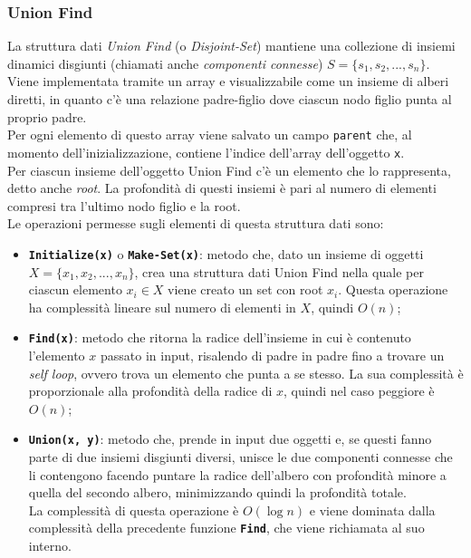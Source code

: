 	\subsubsection{Union Find}
		La struttura dati \textit{Union Find} (o \textit{Disjoint-Set}) mantiene una collezione di insiemi dinamici disgiunti (chiamati anche \textit{componenti connesse}) $S = \{s_1, s_2, ... , s_n\}$.
		Viene implementata tramite un array e visualizzabile come un insieme di alberi diretti, in quanto c'è una relazione padre-figlio dove ciascun nodo figlio punta al proprio padre.\\
		Per ogni elemento di questo array viene salvato un campo \texttt{parent} che, al momento dell'inizializzazione, contiene l'indice dell'array dell'oggetto \texttt{x}.\\
		Per ciascun insieme dell'oggetto Union Find c'è un elemento che lo rappresenta, detto anche \textit{root}. 
		La profondità di questi insiemi è pari al numero di elementi compresi tra l'ultimo nodo figlio e la root.\\
		Le operazioni permesse sugli elementi di questa struttura dati sono:
		\begin{itemize}
			\item \texttt{\textbf{Initialize(x)}} o \texttt{\textbf{Make-Set(x)}}: metodo che, dato un insieme di oggetti $X = \{x_1, x_2, ... , x_n\}$, crea una struttura dati Union Find nella quale per ciascun elemento $x_i \in X$ viene creato un set con root $x_i$.
			Questa operazione ha complessità lineare sul numero di elementi in $X$, quindi $O(n)$;
			\item \texttt{\textbf{Find(x)}}: metodo che ritorna la radice dell'insieme in cui è contenuto l'elemento $x$ passato in input, risalendo di padre in padre fino a trovare un \textit{self loop}, ovvero trova un elemento che punta a se stesso. 
			La sua complessità è proporzionale alla profondità della radice di $x$, quindi nel caso peggiore è $O(n)$;
			\item \texttt{\textbf{Union(x, y)}}: metodo che, prende in input due oggetti e, se questi fanno parte di due insiemi disgiunti diversi, unisce le due componenti connesse che li contengono facendo puntare la radice dell'albero con profondità minore a quella del secondo albero, minimizzando quindi la profondità totale. \\
			La complessità di questa operazione è $O(\log n)$ e viene dominata dalla complessità della precedente funzione \texttt{\textbf{Find}}, che viene richiamata al suo interno.
		\end{itemize}

